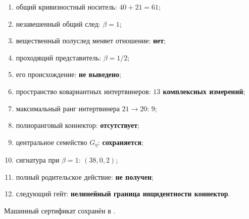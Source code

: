 \begin{protocol}
\begin{enumerate}
 \item общий кривизностный носитель: \textbf{$40+21=61$};
 \item незавешенный общий след: \textbf{$\beta=1$};
 \item вещественный полуслед меняет отношение: \textbf{нет};
 \item проходящий представитель: \textbf{$\beta=1/2$};
 \item его происхождение: \textbf{не выведено};
 \item пространство ковариантных интертвинеров: \textbf{$13$ комплексных измерений};
 \item максимальный ранг интертвинера $21\to20$: \textbf{$9$};
 \item полноранговый коннектор: \textbf{отсутствует};
 \item центральное семейство $G_\eta$: \textbf{сохраняется};
 \item сигнатура при $\beta=1$: \textbf{$(38,0,2)$};
 \item полный родительское действие: \textbf{не получен};
 \item следующий гейт: \textbf{нелинейный граница инцидентности коннектор}.
\end{enumerate}
\end{protocol}

Машинный сертификат сохранён в
.